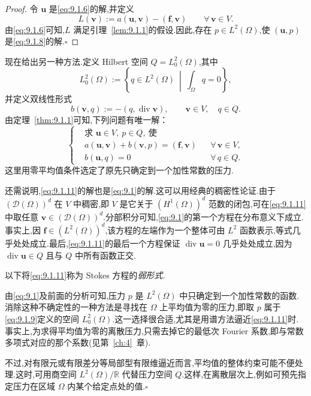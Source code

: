 \begin{proof}
令 \(\boldsymbol{u}\) 是\eqref{eq:9.1.6}的解,并定义
\[
  L(\boldsymbol{v}):=a(\boldsymbol{u},\boldsymbol{v})-(\boldsymbol{f},\boldsymbol{v})
      \qquad\forall\,\boldsymbol{v}\in V.
\]
由\eqref{eq:9.1.6}可知,\(L\) 满足引理~\ref{lem:9.1.1}的假设.因此,存在 \(p\in L^2(\Omega)\),使 \((\boldsymbol{u},p)\) 是\eqref{eq:9.1.8}的解.\hfill\(\square\)
\end{proof}

现在给出另一种方法.定义 Hilbert 空间 \(Q=L_0^2(\Omega)\),其中
\begin{equation}\label{eq:9.1.9}
  L_0^2(\Omega):=\left\{q\in L^2(\Omega)\ \middle|\ \int_\Omega q=0\right\},
\end{equation}
并定义双线性形式
\begin{equation}\label{eq:9.1.10}
  b(\boldsymbol{v},q):=-(q,\operatorname{div}\boldsymbol{v}),\qquad
  \boldsymbol{v}\in V,\quad q\in Q.
\end{equation}
由定理~\ref{thm:9.1.1}可知,下列问题有唯一解：
\begin{equation}\label{eq:9.1.11}
  \left\{
  \begin{aligned}
    &\text{求 }\boldsymbol{u}\in V,\ p\in Q,\ \text{使}\\
    &a(\boldsymbol{u},\boldsymbol{v})+b(\boldsymbol{v},p)=(\boldsymbol{f},\boldsymbol{v})
       &&\forall\,\boldsymbol{v}\in V,\\
    &b(\boldsymbol{u},q)=0&&\forall\,q\in Q.
  \end{aligned}
  \right.
\end{equation}
这里用零平均值条件选定了原先只确定到一个加性常数的压力.

还需说明,\eqref{eq:9.1.11}的解也是\eqref{eq:9.1}的解.这可以用经典的稠密性论证.由于 \((\mathcal D(\Omega))^d\) 在 \(V\) 中稠密,即 \(V\) 是它关于 \((H^1(\Omega))^d\) 范数的闭包,可在\eqref{eq:9.1.11}中取任意 \(\boldsymbol{v}\in(\mathcal D(\Omega))^d\).分部积分可知,\eqref{eq:9.1}的第一个方程在分布意义下成立.事实上,因 \(\boldsymbol{f}\in(L^2(\Omega))^d\),该方程的左端作为一个整体可由 \(L^2\) 函数表示,等式几乎处处成立.最后,\eqref{eq:9.1.11}的最后一个方程保证 \(\operatorname{div}\boldsymbol{u}=0\) 几乎处处成立,因为 \(\operatorname{div}\boldsymbol{u}\in Q\) 且与 \(Q\) 中所有函数正交.

以下将\eqref{eq:9.1.11}称为 Stokes 方程的\emph{弱形式}.

\begin{note}
由\eqref{eq:9.1}及前面的分析可知,压力 \(p\) 是 \(L^2(\Omega)\) 中只确定到一个加性常数的函数.消除这种不确定性的一种方法是寻找在 \(\Omega\) 上平均值为零的压力,即取 \(p\) 属于\eqref{eq:9.1.9}定义的空间 \(L_0^2(\Omega)\).这一选择很合适,尤其是用谱方法逼近\eqref{eq:9.1.11}时.事实上,为求得平均值为零的离散压力,只需去掉它的最低次 Fourier 系数,即与常数多项式对应的那个系数(见第~\ref{ch:4}~章).

不过,对有限元或有限差分等局部型有限维逼近而言,平均值的整体约束可能不便处理.这时,可用商空间 \(L^2(\Omega)/\mathbb R\) 代替压力空间 \(Q\).这样,在离散层次上,例如可预先指定压力在区域 \(\Omega\) 内某个给定点处的值.\hfill\(\square\)
\end{note}

